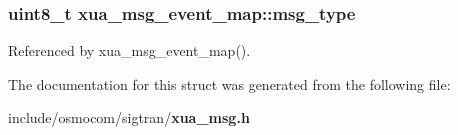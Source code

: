 \subsubsection[{msg\+\_\+type}]{\setlength{\rightskip}{0pt plus 5cm}uint8\+\_\+t xua\+\_\+msg\+\_\+event\+\_\+map\+::msg\+\_\+type}\label{structxua__msg__event__map_a30ed1b7f66a5ff0c8d2e3c988e30a0c5}


Referenced by xua\+\_\+msg\+\_\+event\+\_\+map().



The documentation for this struct was generated from the following file\+:\begin{DoxyCompactItemize}
\item 
include/osmocom/sigtran/{\bf xua\+\_\+msg.\+h}\end{DoxyCompactItemize}
